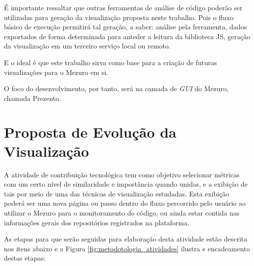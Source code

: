 É importante ressaltar que outras ferramentas de análise de código poderão ser
utilizadas para geração da visualização proposta neste trabalho. Pois o fluxo
básico de execução permitirá tal geração, a saber: análise pela ferramenta,
dados exportados de forma determinada para anteder a leitura da biblioteca JS,
geração da visualização em um terceiro serviço local ou remoto.

E o ideal é que este trabalho sirva como base para a criação de futuras
visualizações para o Mezuro em si.

O foco do desenvolvimento, por tanto, será na camada de \textit{GUI} do Mezuro,
chamada Prezento.

\section{Proposta de Evolução da Visualização}

A atividade de contribuição tecnológica tem como objetivo selecionar métricas
com um certo nível  de similaridade e importância quando unidas, e a exibição de
tais por meio de uma das técnicas de visualização estudadas. Esta exibição
poderá ser uma nova página ou passo dentro do fluxo percorrido pelo usuário ao
utilizar o Mezuro para o monitoramento do código, ou ainda estar contida nas
informações gerais dos repositórios registrados na plataforma.

As etapas para que serão seguidas para elaboração desta atividade estão descrita
nos itens abaixo e a Figura \ref{fig:metodotologia_atividades} ilustra e
encadeamento destas etapas:

